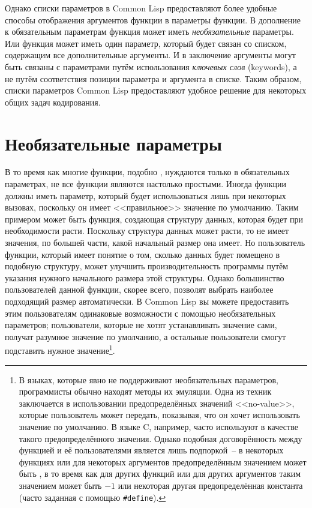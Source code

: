 Однако списки параметров в Common Lisp предоставляют более удобные способы отображения
аргументов функции в параметры функции.  В дополнение к обязательным параметрам функция
может иметь \textit{необязательные} параметры.  Или функция может иметь один параметр,
который будет связан со списком, содержащим все дополнительные аргументы.  И в заключение
аргументы могут быть связаны с параметрами путём использования \textit{ключевых слов}
(keywords), а не путём соответствия позиции параметра и аргумента в списке.  Таким
образом, списки параметров Common Lisp предоставляют удобное решение для некоторых общих
задач кодирования.

\section{Необязательные параметры}

В то время как многие функции, подобно , нуждаются только в обязательных
параметрах, не все функции являются настолько простыми.  Иногда функции должны иметь
параметр, который будет использоваться лишь при некоторых вызовах, поскольку он имеет
<<правильное>> значение по умолчанию.  Таким примером может быть функция, создающая
структуру данных, которая будет при необходимости расти.  Поскольку структура данных может
расти, то не имеет значения, по большей части, какой начальный размер она имеет.  Но
пользователь функции, который имеет понятие о том, сколько данных будет помещено в
подобную структуру, может улучшить производительность программы путём указания нужного
начального размера этой структуры.  Однако большинство пользователей данной функции,
скорее всего, позволят выбрать наиболее подходящий размер автоматически.  В Common Lisp вы
можете предоставить этим пользователям одинаковые возможности с помощью необязательных
параметров; пользователи, которые не хотят устанавливать значение сами, получат разумное
значение по умолчанию, а остальные пользователи смогут подставить нужное
значение\footnote{В языках, которые явно не поддерживают необязательных параметров,
  программисты обычно находят методы их эмуляции.  Одна из техник заключается в
  использовании предопределённых значений <<no-value>>, которые пользователь может
  передать, показывая, что он хочет использовать значение по умолчанию.  В языке C,
  например, часто используют  в качестве такого предопределённого значения.
  Однако подобная договорённость между функцией и её пользователями является лишь
  подпоркой~-- в некоторых функциях или для некоторых аргументов предопределённым
  значением может быть , в то время как для других функций или для других
  аргументов таким значением может быть $-1$ или некоторая другая
  предопределённая константа (часто заданная с помощью \lstinline!#define!).}.

